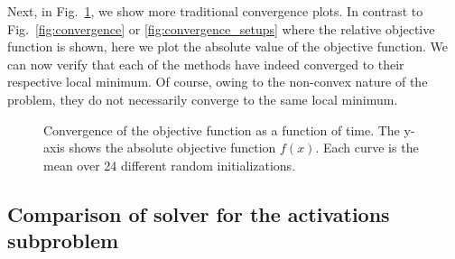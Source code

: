 \begin{appendices}
Next, in Fig.~\ref{fig:convergence_traditional}, we show more traditional convergence plots. In contrast to Fig.~\ref{fig:convergence} or \ref{fig:convergence_setups} where the relative objective function is shown, here we plot the absolute value of the objective function. We can now verify that each of the methods have indeed converged to their respective local minimum. Of course, owing to the non-convex nature of the problem, they do not necessarily converge to the same local minimum.
\begin{figure}[htb]
    \centering
    \vspace{-5pt}
    \caption{Convergence of the objective function as a function of time. The y-axis shows the absolute objective function $f(x)$. Each curve is the mean over 24 different random initializations.}
    \label{fig:convergence_traditional}
\end{figure}

\subsection{Comparison of solver for the activations subproblem}


\end{appendices}
